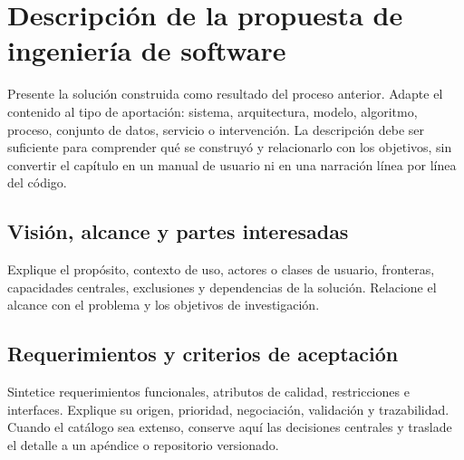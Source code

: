 
\section{Descripción de la propuesta de ingeniería de software}

Presente la solución construida como resultado del proceso anterior. Adapte el
contenido al tipo de aportación: sistema, arquitectura, modelo, algoritmo,
proceso, conjunto de datos, servicio o intervención. La descripción debe ser
suficiente para comprender qué se construyó y relacionarlo con los objetivos,
sin convertir el capítulo en un manual de usuario ni en una narración línea por
línea del código.

\subsection{Visión, alcance y partes interesadas}

Explique el propósito, contexto de uso, actores o clases de usuario, fronteras,
capacidades centrales, exclusiones y dependencias de la solución. Relacione el
alcance con el problema y los objetivos de investigación.

\subsection{Requerimientos y criterios de aceptación}

Sintetice requerimientos funcionales, atributos de calidad, restricciones e
interfaces. Explique su origen, prioridad, negociación, validación y
trazabilidad. Cuando el catálogo sea extenso, conserve aquí las decisiones
centrales y traslade el detalle a un apéndice o repositorio versionado.

